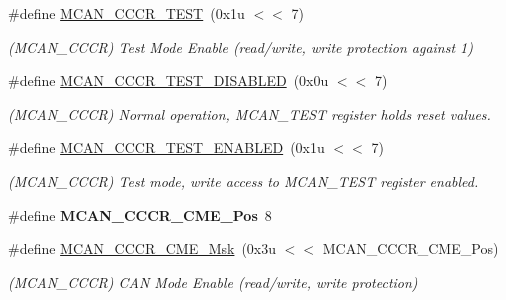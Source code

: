 \begin{DoxyCompactItemize}
\#define \mbox{\hyperlink{group__SAME70__MCAN_ga67951c94eec9d0fade4d5468caa63897}{M\+C\+A\+N\+\_\+\+C\+C\+C\+R\+\_\+\+T\+E\+ST}}~(0x1u $<$$<$ 7)
\begin{DoxyCompactList}\small\item\em (M\+C\+A\+N\+\_\+\+C\+C\+CR) Test Mode Enable (read/write, write protection against \textquotesingle{}1\textquotesingle{}) \end{DoxyCompactList}\item 
\mbox{\label{group__SAME70__MCAN_ga39b644871c9b60e756955d614c844d87}} 
\#define \mbox{\hyperlink{group__SAME70__MCAN_ga39b644871c9b60e756955d614c844d87}{M\+C\+A\+N\+\_\+\+C\+C\+C\+R\+\_\+\+T\+E\+S\+T\+\_\+\+D\+I\+S\+A\+B\+L\+ED}}~(0x0u $<$$<$ 7)
\begin{DoxyCompactList}\small\item\em (M\+C\+A\+N\+\_\+\+C\+C\+CR) Normal operation, M\+C\+A\+N\+\_\+\+T\+E\+ST register holds reset values. \end{DoxyCompactList}\item 
\mbox{\label{group__SAME70__MCAN_ga49fd510567cc1b2312bd98e29587153f}} 
\#define \mbox{\hyperlink{group__SAME70__MCAN_ga49fd510567cc1b2312bd98e29587153f}{M\+C\+A\+N\+\_\+\+C\+C\+C\+R\+\_\+\+T\+E\+S\+T\+\_\+\+E\+N\+A\+B\+L\+ED}}~(0x1u $<$$<$ 7)
\begin{DoxyCompactList}\small\item\em (M\+C\+A\+N\+\_\+\+C\+C\+CR) Test mode, write access to M\+C\+A\+N\+\_\+\+T\+E\+ST register enabled. \end{DoxyCompactList}\item 
\mbox{\label{group__SAME70__MCAN_gabb79a8bacc6a07f3160203ff2eae8e57}} 
\#define {\bfseries M\+C\+A\+N\+\_\+\+C\+C\+C\+R\+\_\+\+C\+M\+E\+\_\+\+Pos}~8
\item 
\mbox{\label{group__SAME70__MCAN_ga101af3cbe56bc9cf8bad6cc04301f10d}} 
\#define \mbox{\hyperlink{group__SAME70__MCAN_ga101af3cbe56bc9cf8bad6cc04301f10d}{M\+C\+A\+N\+\_\+\+C\+C\+C\+R\+\_\+\+C\+M\+E\+\_\+\+Msk}}~(0x3u $<$$<$ M\+C\+A\+N\+\_\+\+C\+C\+C\+R\+\_\+\+C\+M\+E\+\_\+\+Pos)
\begin{DoxyCompactList}\small\item\em (M\+C\+A\+N\+\_\+\+C\+C\+CR) C\+AN Mode Enable (read/write, write protection) \end{DoxyCompactList}\item 

\end{DoxyCompactItemize}
